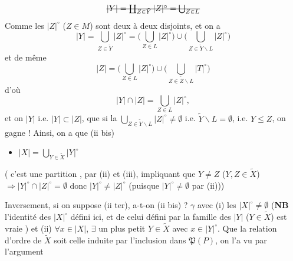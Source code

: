 \documentclass[11pt,a4paper]{article}
\begin{document}
\[
\text{\struck{$|Y| = \coprod_{Z \in \tilde{Y}} |Z|^\circ = \bigcup_{Z \in L}$}}
\]
Comme les $|Z|^\circ$ ($Z \in M$) sont  deux à deux
disjoints,  et on a
\[
|Y| = \bigcup_{Z \in \tilde{Y}} |Z|^\circ = \Big(\bigcup_{Z \in L} |Z|^\circ\Big) \cup \Big(\bigcup_{Z \in \tilde{Y} \smallsetminus L} |Z|^\circ\Big)
\]
 et de même
\[
|Z| = \Big(\bigcup_{Z \in L} |Z|^\circ\Big) \cup \Big(\bigcup_{Z \in \tilde{Z} \smallsetminus L} |T|^\circ\Big)
\]
d'où
\[
|Y| \cap |Z| = \bigcup_{Z \in L} |Z|^\circ ,
\]
et on   $|Y|$ \ill{} i.e. $|Y| \subset |Z|$,
que si la \struck{\ill{}} \ill{} $\bigcup_{Z \in \tilde{Y} \smallsetminus L} |Z|^\circ \neq \emptyset$
i.e. $\tilde{Y} \smallsetminus L = \emptyset$, i.e. $Y \leq Z$,
\struck{\ill{}} on gagne ! Ainsi, on a 
\ill{} que (ii bis) 

\begin{itemize}
  \item[(ii ter)] $\displaystyle |X| = \bigcup_{Y \in \tilde{X}} |Y|^\circ$
\end{itemize}

(\struck{\ill{}} c'est une partition , par (ii) et
(iii), impliquant que $Y \neq Z$ ($Y, Z \in \tilde{X}$) $\Rightarrow
|Y|^\circ \cap |Z|^\circ = \emptyset$ donc $|Y|^\circ \neq |Z|^\circ$
(puisque $|Y|^\circ \neq \emptyset$ par (ii)))

Inversement, si on suppose (ii ter), a-t-on (ii bis) ?   \ill{} $\gamma$  \ill{} avec (i) les $|X|^\circ \neq \emptyset$
(\textbf{NB} l'identité des $|X|^\circ$ défini ici, et de celui défini par la
famille des $|Y|$ ($Y \in \tilde{X}$) est vraie \ill{} ) et (ii) $\forall x \in |X|$, $\exists$ un plus petit
$Y \in \tilde{X}$ avec $x \in |Y|^\circ$. Que la relation d'ordre de
$\tilde{X}$ soit celle induite par l'inclusion dans $\mathfrak{P}(P)$, on l'a
vu par l'argument
\end{document}
